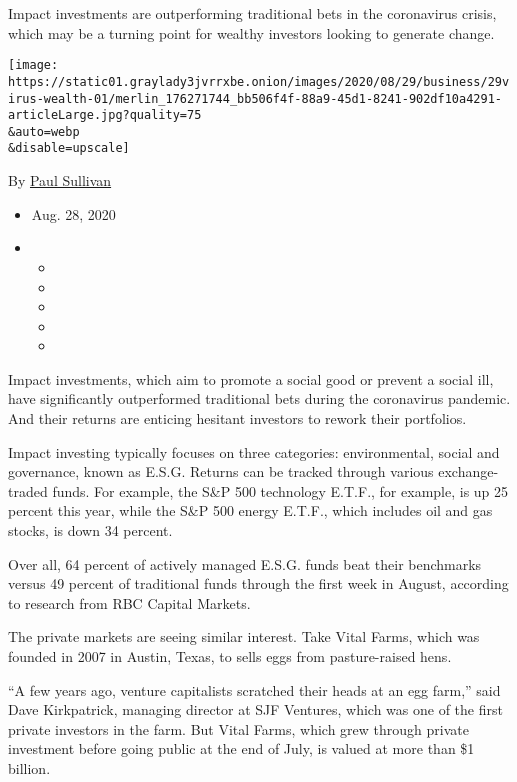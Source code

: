 Impact investments are outperforming traditional bets in the coronavirus
crisis, which may be a turning point for wealthy investors looking to
generate change.

\texttt{[image: https://static01.graylady3jvrrxbe.onion/images/2020/08/29/business/29virus-wealth-01/merlin\_176271744\_bb506f4f-88a9-45d1-8241-902df10a4291-articleLarge.jpg?quality=75\\\&auto=webp\\\&disable=upscale]}

By \href{https://www.nytimes3xbfgragh.onion/by/paul-sullivan}{Paul
Sullivan}

\begin{itemize}
\item
  Aug. 28, 2020
\item
  \begin{itemize}
  \item
  \item
  \item
  \item
  \item
  \end{itemize}
\end{itemize}

Impact investments, which aim to promote a social good or prevent a
social ill, have significantly outperformed traditional bets during the
coronavirus pandemic. And their returns are enticing hesitant investors
to rework their portfolios.

Impact investing typically focuses on three categories: environmental,
social and governance, known as E.S.G. Returns can be tracked through
various exchange-traded funds. For example, the S\&P 500 technology
E.T.F., for example, is up 25 percent this year, while the S\&P 500
energy E.T.F., which includes oil and gas stocks, is down 34 percent.

Over all, 64 percent of actively managed E.S.G. funds beat their
benchmarks versus 49 percent of traditional funds through the first week
in August, according to research from RBC Capital Markets.

The private markets are seeing similar interest. Take Vital Farms, which
was founded in 2007 in Austin, Texas, to sells eggs from pasture-raised
hens.

``A few years ago, venture capitalists scratched their heads at an egg
farm,'' said Dave Kirkpatrick, managing director at SJF Ventures, which
was one of the first private investors in the farm. But Vital Farms,
which grew through private investment before going public at the end of
July, is valued at more than \$1 billion.

